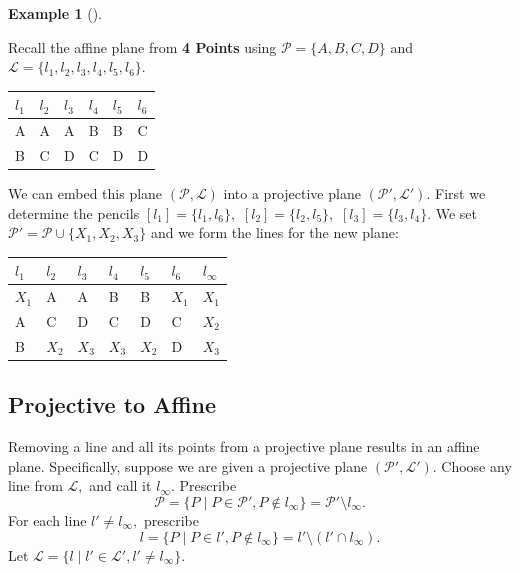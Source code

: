 \documentclass[
  twoside,
  12pt,
  letterpaper,
  fleqn]{article}
\theoremstyle{definition}
\theoremstyle{definition}
\newtheorem{example}{Example}[section]
\theoremstyle{plain}
\theoremstyle{plain}
\theoremstyle{remark}
\begin{document}
\begin{example}[]\protect\hypertarget{exm-four-oints}{}\label{exm-four-oints}

Recall the affine plane from \textbf{4 Points} using
\(\mathcal{P}=\{A, B, C, D\}\) and
\(\mathcal{L}=\{l_1, l_2, l_3, l_4, l_5, l_6\}.\)

\begin{longtable}[]{@{}llllll@{}}
\toprule()
\(l_1\) & \(l_2\) & \(l_3\) & \(l_4\) & \(l_5\) & \(l_6\) \\
\midrule()
\endhead
A & A & A & B & B & C \\
B & C & D & C & D & D \\
\bottomrule()
\end{longtable}

We can embed this plane \((\mathcal{P},\mathcal{L})\) into a projective
plane \((\mathcal{P}',\mathcal{L}').\) First we determine the pencils
\([l_1]=\{l_1, l_6\},\) \([l_2]=\{l_2, l_5\},\) \([l_3]=\{l_3, l_4\}.\)
We set \(\mathcal{P}'=\mathcal{P}\cup \{X_1, X_2, X_3\}\) and we form
the lines for the new plane:

\begin{longtable}[]{@{}lllllll@{}}
\toprule()
\(l_1\) & \(l_2\) & \(l_3\) & \(l_4\) & \(l_5\) & \(l_6\) &
\(l_{\infty}\) \\
\midrule()
\endhead
\(X_1\) & A & A & B & B & \(X_1\) & \(X_1\) \\
A & C & D & C & D & C & \(X_2\) \\
B & \(X_2\) & \(X_3\) & \(X_3\) & \(X_2\) & D & \(X_3\) \\
\bottomrule()
\end{longtable}

\end{example}

\hypertarget{projective-to-affine}{%
\subsection{Projective to Affine}\label{projective-to-affine}}

Removing a line and all its points from a projective plane results in an
affine plane. Specifically, suppose we are given a projective plane
\((\mathcal{P}',\mathcal{L}').\) Choose any line from \(\mathcal{L},\)
and call it \(l_{\infty}.\) Prescribe \[
\mathcal{P}=\{P\mid P\in \mathcal{P}', P\notin l_{\infty}\}
=\mathcal{P}'\setminus l_{\infty}.
\] For each line \(l'\neq l_{\infty},\) prescribe \[
l=\{P\mid P\in l', P\notin l_{\infty}\}=l'\setminus (l'\cap l_{\infty}).
\] Let \(\mathcal{L}=\{l\mid l'\in \mathcal{L}', l'\neq l_{\infty}\}.\)
\end{document}

